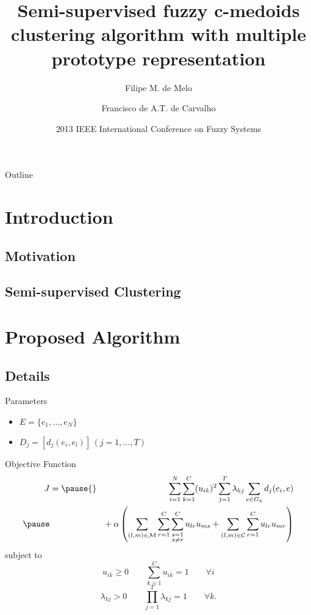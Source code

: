 \documentclass{beamer}
\title[Semi-supervised fuzzy c-medoids clustering algorithm]{Semi-supervised fuzzy c-medoids clustering algorithm with multiple prototype representation}
\author{
	Filipe M. de Melo\inst{1} \and Francisco de A.T. de Carvalho\inst{1}
}
\institute{
	Center of Informatics\\
	Federal University of Pernambuco
}
\date[fuzzIEEE 2013]{2013 IEEE International Conference on Fuzzy Systems}
\begin{document}
\begin{frame}
	\titlepage
\end{frame}

\begin{frame}{Outline}
	\tableofcontents
\end{frame}

\section{Introduction}
\subsection{Motivation}
\subsection{Semi-supervised Clustering}

\section{Proposed Algorithm}

%
\subsection{Details}

\begin{frame}{Parameters}
\begin{itemize}
\item{$E=\{e_{1},\ldots,e_{N}\}$}
\item{$D_{j} = [d_{j}(e_{i},e_{l})]\,(j=1,\ldots,T)$}
\end{itemize}
\end{frame}

\begin{frame}{Objective Function}
\begin{eqnarray*}
  J&{}=
  \pause
  {}&\sum_{i=1}^{N}\sum_{k=1}^{C}(u_{ik})^{2}\sum_{j=1}^{T}\lambda_{kj}\sum_{e \in G_{k}}d_{j}(e_{i},e)\\
  \pause
  &&{+}\:\alpha\left (\sum_{(l,m)\in\mathcal{M}}\sum_{r=1}^{C}\sum_{\substack{s=1 \\{s}\neq{r}}}^{C}u_{lr}u_{ms}+\sum_{(l,m)\in\mathcal{C}}\sum_{r=1}^{C}u_{lr}u_{mr}\right )
\end{eqnarray*}
  \pause
subject to
\begin{displaymath}
  u_{ik} \geq 0\qquad\sum_{k=1}^{C}u_{ik} = 1\qquad\forall i
\end{displaymath}
\begin{displaymath}
  \lambda_{kj} > 0\qquad\prod_{j=1}^{T}\lambda_{kj} = 1\qquad\forall k.
\end{displaymath}
\end{frame}


\end{document}
